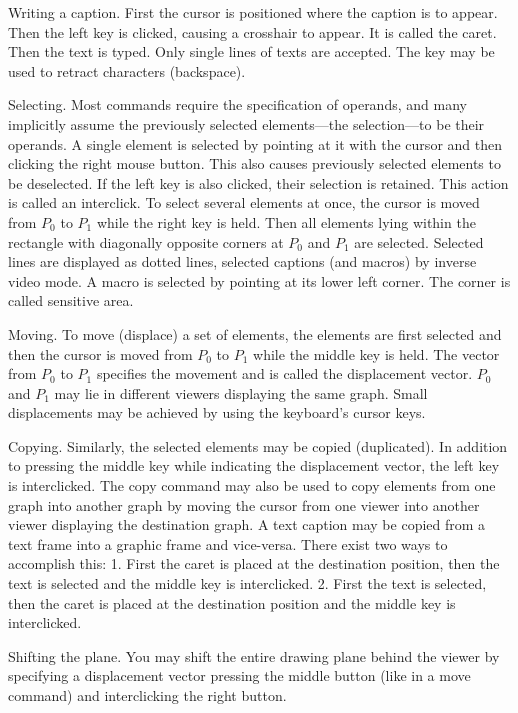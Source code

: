 Writing a caption. First the cursor is positioned where the caption is to appear. Then the left key is clicked, causing a crosshair to appear. It is called the caret. Then the text is typed. Only single lines of texts are accepted. The  key may be used to retract characters (backspace).

Selecting. Most commands require the specification of operands, and many implicitly assume the previously selected elements---the selection---to be their operands. A single element is selected by pointing at it with the cursor and then clicking the right mouse button. This also causes previously selected elements to be deselected. If the left key is also clicked, their selection is retained. This action is called an interclick. To select several elements at once, the cursor is moved from $P_0$ to $P_1$ while the right key is held. Then all elements lying within the rectangle with diagonally opposite corners at $P_0$ and $P_1$ are selected. Selected lines are displayed as dotted lines, selected captions (and macros) by inverse video mode. A macro is selected by pointing at its lower left corner. The corner is called sensitive area.

Moving. To move (displace) a set of elements, the elements are first selected and then the cursor is moved from $P_0$ to $P_1$ while the middle key is held. The vector from $P_0$ to $P_1$ specifies the movement and is called the displacement vector. $P_0$ and $P_1$ may lie in different viewers displaying the same graph. Small displacements may be achieved by using the keyboard's cursor keys.

Copying. Similarly, the selected elements may be copied (duplicated). In addition to pressing the middle key while indicating the displacement vector, the left key is interclicked. The copy command may also be used to copy elements from one graph into another graph by moving the cursor from one viewer into another viewer displaying the destination graph. A text caption may be copied from a text frame into a graphic frame and vice-versa. There exist two ways to accomplish this: 1. First the caret is placed at the destination position, then the text is selected and the middle key is interclicked. 2. First the text is selected, then the caret is placed at the destination position and the middle key is interclicked.

Shifting the plane. You may shift the entire drawing plane behind the viewer by specifying a displacement vector pressing the middle button (like in a move command) and interclicking the right button.

